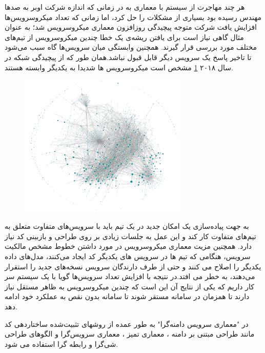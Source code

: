 هر چند مهاجرت از سیستم با معماری  به  در زمانی که اندازه شرکت اوبر به صد‌ها مهندس رسیده بود بسیاری از مشکلات را حل کرد، اما زمانی که تعداد میکرو‌سرویس‌ها افزایش یافت شرکت متوجه پیچیدگی روزافزون معماری میکروسرویس شد؛ به عنوان مثال گاهی نیاز است برای یافتن ریشه‌ی یک خطا چندین میکروسرویس از تیم‌های مختلف مورد بررسی قرار گیرند. همچنین وابستگی میان سرویس‌ها گاه سبب می‌شود تا تاخیر پاسخ یک سرویس دیگر قابل قبول نباشد.همان طور که از پیچیدگی شبکه  در سال ۲۰۱۸ \ref{fig:microserice_network} مشخص است میکروسرویس ها شدیدا به یکدیگر وابسته هستند.
\begin{figure}[h]
\label{fig:microserice_network}
\centering
\includegraphics[width=8cm]{uber_service_network.png}
\end{figure}

به جهت پیاده‌سازی یک امکان جدید در  یک تیم باید با سرویس‌‌های متفاوت متعلق به تیم‌های متفاوت کار کند و این عمل به جلسات زیادی بر روی طراحی و بازبینی کد نیاز دارد. همچنین مزیت معماری میکروسرویس در مورد داشتن خطوط مشخص مالکیت سرویس، هنگامی که تیم ها در سرویس های یکدیگر کد ایجاد می‌کنند، مدل‌های داده یکدیگر را اصلاح می کنند و حتی از طرف دارندگان سرویس نسخه‌های جدید را استقرار می‌دهند، به خطر می افتد.در نتیجه با افزایش تعداد سرویس‌ها گویا با یک سیستم  سر کار داریم که یکی از نتایج آن این است که چندین میکروسرویس به ظاهر مستقل نیاز دارند تا همزمان در سامانه مستقر شوند تا سامانه بدون نقص به عملکرد خود ادامه دهد.

در "معماری سرویس دامنه‌گرا" به طور عمده از روشهای تثبیت‌شده ساختار‌دهی کد مانند طراحی مبتنی بر دامنه  \cite{evans2004domain}، معماری تمیز \cite{martin2018clean}، معماری سرویس‌گرا \cite{perrey2003service} و الگوهای طراحی شی‌گرا  و رابطه گرا استفاده می شود.

